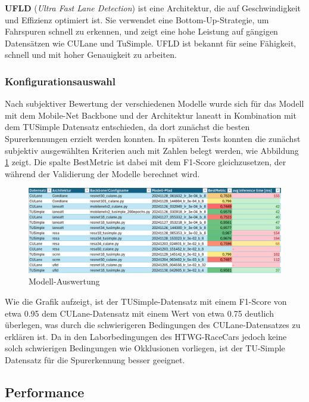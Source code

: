 \documentclass{article}
\begin{document}
                \textbf{UFLD} (\textit{Ultra Fast Lane Detection}) ist eine Architektur, die auf Geschwindigkeit und Effizienz optimiert ist. Sie verwendet eine Bottom-Up-Strategie, um Fahrspuren schnell zu erkennen, und zeigt eine hohe Leistung auf gängigen Datensätzen wie CULane und TuSimple. UFLD ist bekannt für seine Fähigkeit, schnell und mit hoher Genauigkeit zu arbeiten.
                \cite{Xu2024Exploring}

            \subsubsection{Konfigurationsauswahl}
                Nach subjektiver Bewertung der verschiedenen Modelle wurde sich für das Modell mit dem Mobile-Net Backbone und der Architektur laneatt in Kombination mit dem TUSimple Datensatz entschieden, da dort zunächst die besten Spurerkennungen erzielt werden konnten.
                In späteren Tests konnten die zunächst subjektiv ausgewählten Kriterien auch mit Zahlen belegt werden, wie Abbildung \ref{fig:Modell_Auswertung} zeigt.
                Die spalte BestMetric ist dabei mit dem F1-Score gleichzusetzen, der während der Validierung der Modelle berechnet wird.
                \begin{figure}[h!]
                    \includegraphics[width=\linewidth]{Auswertung_BackBone_Datensatz.png}
                    \caption{Modell-Auswertung}
                    \label{fig:Modell_Auswertung}
                \end{figure}
                Wie die Grafik aufzeigt, ist der TUSimple-Datensatz mit einem F1-Score von etwa 0.95 dem CULane-Datensatz mit einem Wert von etwa 0.75 deutlich überlegen, was durch die schwierigeren Bedingungen des CULane-Datensatzes zu erklären ist. Da in den Laborbedingungen des HTWG-RaceCars jedoch keine solch schwierigen Bedingungen wie Okklusionen vorliegen, ist der TU-Simple Datensatz für die Spurerkennung besser geeignet.

        \subsection{Performance}
\end{document}
